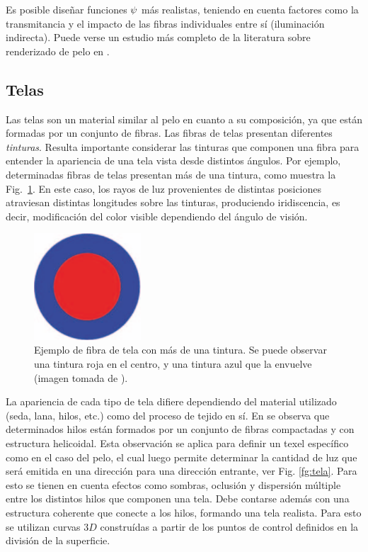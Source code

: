 Es posible diseñar funciones $\bold{\psi}$ más realistas, teniendo en cuenta factores como la transmitancia y el impacto de las fibras individuales entre sí (iluminación indirecta).
Puede verse un estudio más completo de la literatura sobre renderizado de pelo en \cite{Ward2007}.

\subsection{Telas}
Las telas son un material similar al pelo en cuanto a su composición, ya que están formadas por un conjunto de fibras.
Las fibras de telas presentan diferentes {\em tinturas}.
Resulta importante considerar las tinturas que componen una fibra para entender la apariencia de una tela vista desde distintos ángulos.
Por ejemplo, determinadas fibras de telas presentan más de una tintura, como muestra la Fig.~\ref{fg:fibra}.
En este caso, los rayos de luz provenientes de distintas posiciones atraviesan distintas longitudes sobre las tinturas, produciendo iridiscencia, es decir, modificación del color visible dependiendo del ángulo de visión.

\begin{figure}
\center
\includegraphics[width=4cm]{figures/fibra}
\caption[Ejemplo de fibra de tela con más de una tintura]{Ejemplo de fibra de tela con más de una tintura. Se puede observar una tintura roja en el centro, y una tintura azul que la envuelve (imagen tomada de \cite{Xu2001}).}
\label{fg:fibra}
\end{figure}

La apariencia de cada tipo de tela difiere dependiendo del material utilizado (seda, lana, hilos, etc.) como del proceso de tejido en sí.
En \cite{Xu2001} se observa que determinados hilos están formados por un conjunto de fibras compactadas y con estructura helicoidal.
Esta observación se aplica para definir un texel específico como en el caso del pelo, el cual luego permite determinar la cantidad de luz que será emitida en una dirección para una dirección entrante, ver Fig. \ref{fg:tela}.
Para esto se tienen en cuenta efectos como sombras, oclusión y dispersión múltiple entre los distintos hilos que componen una tela.
Debe contarse además con una estructura coherente que conecte a los hilos, formando una tela realista.
Para esto se utilizan curvas $3D$ construídas a partir de los puntos de control definidos en la división de la superficie.


